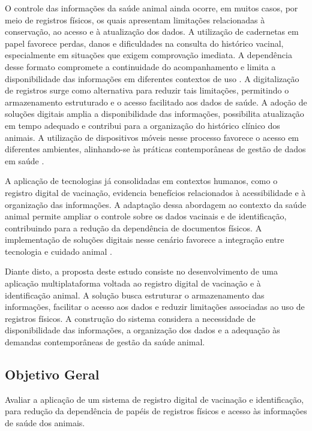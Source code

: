 \documentclass{UNESC}
\begin{document}
O controle das informações da saúde animal ainda ocorre, em muitos casos, por meio de registros físicos, os quais apresentam limitações relacionadas à conservação, ao acesso e à atualização dos dados. A utilização de cadernetas em papel favorece perdas, danos e dificuldades na consulta do histórico vacinal, especialmente em situações que exigem comprovação imediata. A dependência desse formato compromete a continuidade do acompanhamento e limita a disponibilidade das informações em diferentes contextos de uso \cite{BOLSON2022}. A digitalização de registros surge como alternativa para reduzir tais limitações, permitindo o armazenamento estruturado e o acesso facilitado aos dados de saúde. A adoção de soluções digitais amplia a disponibilidade das informações, possibilita atualização em tempo adequado e contribui para a organização do histórico clínico dos animais. A utilização de dispositivos móveis nesse processo favorece o acesso em diferentes ambientes, alinhando-se às práticas contemporâneas de gestão de dados em saúde \cite{VIEIRA2020}.

A aplicação de tecnologias já consolidadas em contextos humanos, como o registro digital de vacinação, evidencia benefícios relacionados à acessibilidade e à organização das informações. A adaptação dessa abordagem ao contexto da saúde animal permite ampliar o controle sobre os dados vacinais e de identificação, contribuindo para a redução da dependência de documentos físicos. A implementação de soluções digitais nesse cenário favorece a integração entre tecnologia e cuidado animal \cite{MARTINS2024}.

Diante disto, a proposta deste estudo consiste no desenvolvimento de uma aplicação multiplataforma voltada ao registro digital de vacinação e à identificação animal. A solução busca estruturar o armazenamento das informações, facilitar o acesso aos dados e reduzir limitações associadas ao uso de registros físicos. A construção do sistema considera a necessidade de disponibilidade das informações, a organização dos dados e a adequação às demandas contemporâneas de gestão da saúde animal.

\subsection{Objetivo Geral}

Avaliar a aplicação de um sistema de registro digital de vacinação e identificação, para redução da dependência de papéis de registros físicos e acesso às informações de saúde dos animais.
\end{document}

